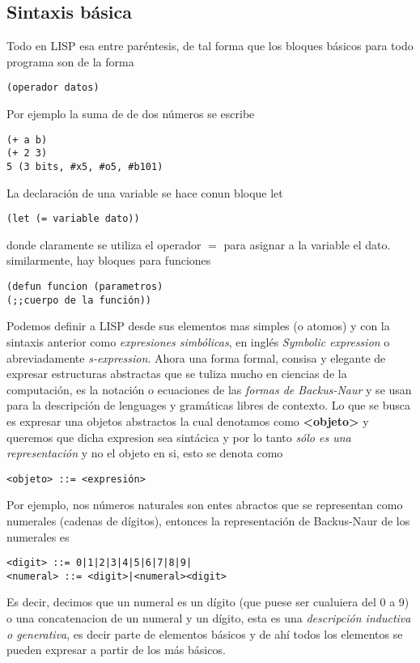 \documentclass[11pt]{article}
\begin{document}
\subsection{Sintaxis básica}
\label{sec:org700632a}
Todo en LISP esa entre paréntesis, de tal forma que los bloques básicos para todo programa son de la forma
\begin{verbatim}
(operador datos)
\end{verbatim}
Por ejemplo la suma de de dos números se escribe
\begin{verbatim}
(+ a b)
(+ 2 3)
5 (3 bits, #x5, #o5, #b101)
\end{verbatim}
La declaración de una variable se hace conun bloque let
\begin{verbatim}
(let (= variable dato))
\end{verbatim}
donde claramente se utiliza el operador \(=\) para asignar a la variable el dato. similarmente, hay bloques para funciones
\begin{verbatim}
(defun funcion (parametros)
(;;cuerpo de la función))
\end{verbatim}
Podemos definir a LISP desde sus elementos mas simples (o atomos) y con la sintaxis anterior como \emph{expresiones simbólicas}, en inglés \emph{Symbolic expression} o abreviadamente \emph{s-expression}. Ahora una forma formal, consisa y elegante de expresar estructuras abstractas que se tuliza mucho en ciencias de la computación, es la notación o ecuaciones de las \emph{formas de Backus-Naur} y se usan para la descripción de lenguages y gramáticas libres de contexto. Lo que se busca es expresar una objetos abstractos la cual denotamos como \textbf{<objeto>} y queremos que dicha expresion sea sintácica y por lo tanto \emph{sólo es una representación} y no el objeto en si, esto se denota como
\begin{verbatim}
<objeto> ::= <expresión>
\end{verbatim}
Por ejemplo, nos números naturales son entes abractos que se representan como numerales (cadenas de dígitos), entonces la representación de Backus-Naur de los numerales es
\begin{verbatim}
<digit> ::= 0|1|2|3|4|5|6|7|8|9|
<numeral> ::= <digit>|<numeral><digit>
\end{verbatim}
Es decir, decimos que un numeral es un dígito (que puese ser cualuiera del 0 a 9) o una concatenacion de un numeral y un dígito, esta es una \emph{descripción inductiva o generativa}, es decir parte de elementos básicos y de ahí todos los elementos se pueden expresar a partir de los más básicos.
\end{document}

